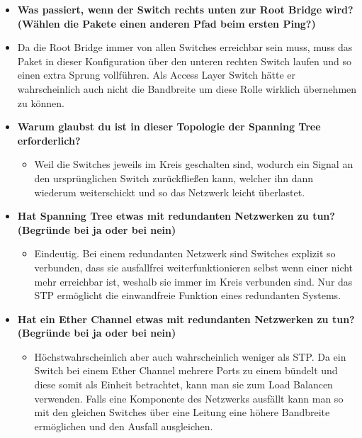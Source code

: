 \documentclass{article}
\begin{document}
\begin{itemize}
\begin{itemize}
			\item{Die Root Bridge kann auf zwei Weisen geändert werden:}
			\begin{itemize}
				\item{Durch die Root Bridge Election, welche mehrere Parameter wie Verbindungsgeschwindigkeit, der MAC-Adresse und vor allem die Bridge Priority verwendet um die beste Root Bridge zu küren. Die Bridge Priority kann mit \texttt{spanning-tree vlan 1 priority <priority>} geändert werden.}
				\item{Indem ein Switch manuell als Root erklärt wird und zwar durch \texttt{spanning-tree vlan 1 root}}
			\end{itemize}
		\end{itemize}
		\item{\textbf{Was passiert, wenn der Switch rechts unten zur Root Bridge wird? (Wählen die Pakete einen anderen Pfad beim ersten Ping?)}}
		\item{Da die Root Bridge immer von allen Switches erreichbar sein muss, muss das Paket in dieser Konfiguration über den unteren rechten Switch laufen und so einen extra Sprung vollführen. Als Access Layer Switch hätte er wahrscheinlich auch nicht die Bandbreite um diese Rolle wirklich übernehmen zu können.}
		\item{\textbf{Warum glaubst du ist in dieser Topologie der Spanning Tree erforderlich?}}
		\begin{itemize}
			\item{Weil die Switches jeweils im Kreis geschalten sind, wodurch ein Signal an den ursprünglichen Switch zurückfließen kann, welcher ihn dann wiederum weiterschickt und so das Netzwerk leicht überlastet.}
		\end{itemize}
		\item{\textbf{Hat Spanning Tree etwas mit redundanten Netzwerken zu tun? (Begründe bei ja oder bei nein)}}
		\begin{itemize}
			\item{Eindeutig. Bei einem redundanten Netzwerk sind Switches explizit so verbunden, dass sie ausfallfrei weiterfunktionieren selbst wenn einer nicht mehr erreichbar ist, weshalb sie immer im Kreis verbunden sind. Nur das STP ermöglicht die einwandfreie Funktion eines redundanten Systems.}
		\end{itemize}
		\item{\textbf{Hat ein Ether Channel etwas mit redundanten Netzwerken zu tun? (Begründe bei ja oder bei nein)}}
		\begin{itemize}
			\item{Höchstwahrscheinlich aber auch wahrscheinlich weniger als STP. Da ein Switch bei einem Ether Channel mehrere Ports zu einem bündelt und diese somit als Einheit betrachtet, kann man sie zum Load Balancen verwenden. Falls eine Komponente des Netzwerks ausfällt kann man so mit den gleichen Switches über eine Leitung eine höhere Bandbreite ermöglichen und den Ausfall ausgleichen.}
		\end{itemize}
	\end{itemize}
\end{document}
